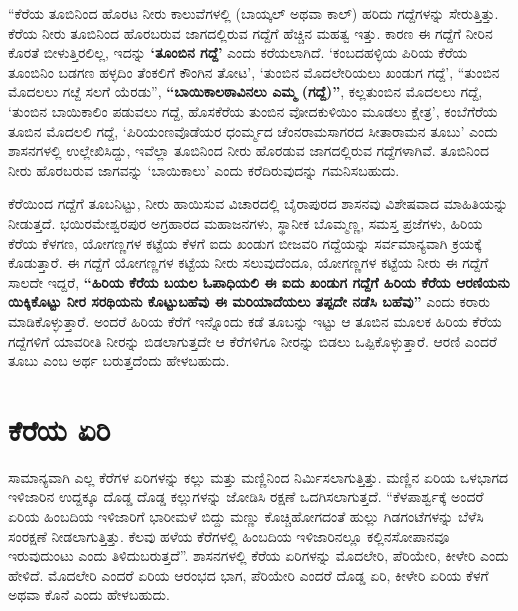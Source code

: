 “ಕೆರೆಯ ತೂಬಿನಿಂದ ಹೊರಟ ನೀರು ಕಾಲುವೆಗಳಲ್ಲಿ (ಬಾಯ್ಕಲ್​ ಅಥವಾ ಕಾಲ್​) ಹರಿದು ಗದ್ದೆಗಳನ್ನು ಸೇರುತ್ತಿತ್ತು. ಕೆರೆಯ ನೀರು ತೂಬಿನಿಂದ ಹೊರಬರುವ ಜಾಗದಲ್ಲಿರುವ ಗದ್ದೆಗೆ ಹೆಚ್ಚಿನ ಮಹತ್ವ ಇತ್ತು. ಕಾರಣ ಈ ಗದ್ದೆಗೆ ನೀರಿನ ಕೊರತೆ ಬೀಳುತ್ತಿರಲಿಲ್ಲ, ಇದನ್ನು \textbf{‘ತೂಂಬಿನ ಗದ್ದೆ’} ಎಂದು ಕರೆಯಲಾಗಿದೆ. ‘ಕಂಬದಹಳ್ಳಿಯ ಪಿರಿಯ ಕೆರೆಯ ತೂಂಬಿನಿಂ ಬಡಗಣ ಹಳ್ಳದಿಂ ತೆಂಕಲಿಗೆ ಕೌಂಗಿನ ತೋಟ’, ‘ತುಂಬಿನ ಮೊದಲೇರಿಯಲು ಖಂಡುಗ ಗದ್ದೆ’, “ತುಂಬಿನ ಮೊದಲಲು ಗೞ್ದೆ ಸಲಗೆ ಯೆರಡು”, \textbf{“ಬಾಯಿಕಾಲಠಾವಿನಲು ಎಮ್ಮ (ಗದ್ದೆ)”}, ಕಲ್ಲತುಂಬಿನ ಮೊದಲಲು ಗದ್ದೆ, ‘ತುಂಬಿನ ಬಾಯಿಕಾಲಿಂ ಪಡುವಲು ಗದ್ದೆ, ಹೊಸಕೆರೆಯ ತುಂಬಿನ ವೋದಕುಳಿಯಿಂ ಮೂಡಲು ಕ್ಷೇತ್ರ’, ಕಂಬೆಗೆರೆಯ ತೂಬಿನ ಮೊದಲಲಿ ಗದ್ದೆ,  ‘ಪಿರಿಯಂಣವೊಡೆಯರ ಧಂರ್ಮ್ಮದ ಚೆಂನರಾಮಸಾಗರದ ಸೀತಾರಾಮನ ತೂಬು’ ಎಂದು ಶಾಸನಗಳಲ್ಲಿ ಉಲ್ಲೇಖಿಸಿದ್ದು, ಇವೆಲ್ಲಾ ತೂಬಿನಿಂದ ನೀರು ಹೊರಡುವ ಜಾಗದಲ್ಲಿರುವ ಗದ್ದೆಗಳಾಗಿವೆ. ತೂಬಿನಿಂದ ನೀರು ಹೊರಬರುವ ಜಾಗವನ್ನು ‘ಬಾಯಿಕಾಲು’ ಎಂದು ಕರೆದಿರುವುದನ್ನು ಗಮನಿಸಬಹುದು.

ಕೆರೆಯಿಂದ ಗದ್ದೆಗೆ ತೂಬನಿಟ್ಟು, ನೀರು ಹಾಯಿಸುವ ವಿಚಾರದಲ್ಲಿ ಬೈರಾಪುರದ ಶಾಸನವು ವಿಶೇಷವಾದ ಮಾಹಿತಿಯನ್ನು ನೀಡುತ್ತದೆ. ಭಯಿರಮೇಶ್ವರಪುರ ಅಗ್ರಹಾರದ ಮಹಾಜನಗಳು, ಸ್ಥಾನೀಕ ಬೊಮ್ಮಣ್ಣ, ಸಮಸ್ತ ಪ್ರಜೆಗಳು, ಹಿರಿಯ ಕೆರೆಯ ಕೆಳಗಣ, ಯೋಗಣ್ಣಗಳ ಕಟ್ಟೆಯ ಕೆಳಗೆ ಐದು ಖಂಡುಗ ಬೀಜವರಿ ಗದ್ದೆಯನ್ನು ಸರ್ವಮಾನ್ಯವಾಗಿ ಕ್ರಯಕ್ಕೆ ಕೊಡುತ್ತಾರೆ. ಈ ಗದ್ದೆಗೆ ಯೋಗಣ್ಣಗಳ ಕಟ್ಟೆಯ ನೀರು ಸಲುವುದೆಂದೂ, ಯೋಗಣ್ಣಗಳ ಕಟ್ಟೆಯ ನೀರು ಈ ಗದ್ದೆಗೆ ಸಾಲದೇ ಇದ್ದರೆ, \textbf{“ಹಿರಿಯ ಕೆರೆಯ ಬಯಲ ಓಪಾಧಿಯಲಿ ಈ ಐದು ಖಂಡುಗ ಗದ್ದೆಗೆ ಹಿರಿಯ ಕೆರೆಯ ಆರಣಿಯನು ಯಿಕ್ಕಿಕೊಟ್ಟು ನೀರ ಸರಥಿಯನು ಕೊಟ್ಟುಬಹೆವು ಈ ಮರಿಯಾದೆಯಲು ತಪ್ಪದೇ ನಡೆಸಿ ಬಹೆವು”} ಎಂದು ಕರಾರು ಮಾಡಿಕೊಳ್ಳುತ್ತಾರೆ. ಅಂದರೆ ಹಿರಿಯ ಕೆರೆಗೆ ಇನ್ನೊಂದು ಕಡೆ ತೂಬನ್ನು ಇಟ್ಟು ಆ ತೂಬಿನ ಮೂಲಕ ಹಿರಿಯ ಕೆರೆಯ ಗದ್ದೆಗಳಿಗೆ ಯಾವರೀತಿ ನೀರನ್ನು ಬಿಡಲಾಗುತ್ತದೇ ಆ ಕೆರೆಗಳಿಗೂ ನೀರನ್ನು ಬಿಡಲು ಒಪ್ಪಿಕೊಳ್ಳುತ್ತಾರೆ. ಆರಣಿ ಎಂದರೆ ತೂಬು ಎಂಬ ಅರ್ಥ ಬರುತ್ತದೆಂದು ಹೇಳಬಹುದು.

\section*{ಕೆರೆಯ ಏರಿ}

ಸಾಮಾನ್ಯವಾಗಿ ಎಲ್ಲ ಕೆರೆಗಳ ಏರಿಗಳನ್ನು ಕಲ್ಲು ಮತ್ತು ಮಣ್ಣಿನಿಂದ ನಿರ್ಮಿಸಲಾಗುತ್ತಿತ್ತು. ಮಣ್ಣಿನ ಏರಿಯ ಒಳಭಾಗದ ಇಳಿಜಾರಿನ ಉದ್ದಕ್ಕೂ ದೊಡ್ಡ ದೊಡ್ಡ ಕಲ್ಲುಗಳನ್ನು ಜೋಡಿಸಿ ರಕ್ಷಣೆ ಒದಗಿಸಲಾಗುತ್ತದೆ. “ಕೆಳಪಾರ್ಶ್ವಕ್ಕೆ ಅಂದರೆ ಏರಿಯ ಹಿಂಬದಿಯ ಇಳಿಜಾರಿಗೆ ಭಾರೀಮಳೆ ಬಿದ್ದು ಮಣ್ಣು ಕೊಚ್ಚಿಹೋಗದಂತೆ ಹುಲ್ಲು ಗಿಡಗಂಟೆಗಳನ್ನು ಬೆಳೆಸಿ ಸಂರಕ್ಷಣೆ ನೀಡಲಾಗುತ್ತಿತ್ತು. ಕೆಲವು ಹಳೆಯ ಕೆರೆಗಳಲ್ಲಿ ಹಿಂಬದಿಯ ಇಳಿಜಾರಿನಲ್ಲೂ ಕಲ್ಲಿನಸೋಪಾನವೂ ಇರುವುದುಂಟು ಎಂದು ತಿಳಿದುಬರುತ್ತದೆ”. ಶಾಸನಗಳಲ್ಲಿ ಕೆರೆಯ ಏರಿಗಳನ್ನು ಮೊದಲೇರಿ, ಪೆರಿಯೇರಿ, ಕೀಳೇರಿ ಎಂದು ಹೇಳಿದೆ. ಮೊದಲೇರಿ ಎಂದರೆ ಏರಿಯ ಆರಂಭದ ಭಾಗ, ಪೆರಿಯೇರಿ ಎಂದರೆ ದೊಡ್ಡ ಏರಿ, ಕೀಳೇರಿ ಏರಿಯ ಕೆಳಗೆ ಅಥವಾ ಕೊನೆ ಎಂದು ಹೇಳಬಹುದು.

